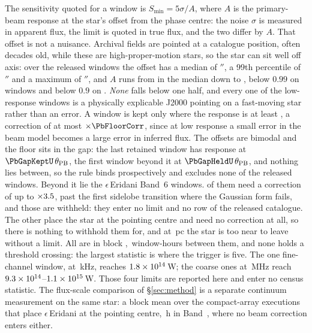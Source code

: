 The sensitivity quoted for a window is $S_{\min}=5\sigma/A$, where $A$ is the
primary-beam response at the star's offset from the phase centre: the noise
$\sigma$ is measured in apparent flux, the limit is quoted in true flux, and
the two differ by $A$. That offset is not a nuisance. Archival fields are
pointed at a catalogue position, often decades old, while these are
high-proper-motion stars, so the star can sit well off axis: over the
\PbNWin{} released windows the offset has a median of \PbOffMed$''$, a 99th
percentile of \PbOffPNN$''$ and a maximum of \PbOffMax$''$, and $A$ runs from
\PbAMed{} in the median down to \PbAMin, below $0.99$ on \PbNLowNN{} windows
and below $0.9$ on \PbNLowN. \emph{None} falls below one half, and every one
of the low-response windows is a physically explicable J2000 pointing on a
fast-moving star rather than an error. A window is kept only where the
response is at least \PbFloorResp, a correction of at most
$\times\PbFloorCorr$, since at low response a small error in the beam model
becomes a large error in inferred flux. The offsets are bimodal and the floor
sits in the gap: the last retained window has response \PbGapKeptResp{} at
$\PbGapKeptU\,\theta_{\rm PB}$, the first window beyond it \PbGapHeldResp{}
at $\PbGapHeldU\,\theta_{\rm PB}$, and nothing lies between, so the rule
binds prospectively and excludes none of the \NWindows{} released windows.
Beyond it lie the \EpsEriNWin{} $\epsilon$\,Eridani Band~6 windows.
\EpsEriNOffAxis{} of them need a correction of up to $\times3.5$,
past the first sidelobe transition where the Gaussian form fails, and those
are withheld: they enter no limit and no row of the released catalogue. The
other \EpsEriNOnAxis{} place the star at the pointing centre and need no
correction at all, so there is nothing to withhold them for, and at
\EpsEriDistPc\,pc the star is too near to leave without a limit. All
\EpsEriNOnAxis{} are in block \texttt{\BkEpsOnBlock},
\BkEpsOnHours\,window-hours between them, and none holds a threshold
crossing: the largest statistic is \BkEpsOnTMax{} where the trigger is five.
The one fine-channel window, at \BkEpsOnChanFineKHz\,kHz, reaches
$1.8\times10^{14}$\,W; the \BkEpsOnNCoarse{} coarse ones at
\BkEpsOnChanCoarseMHz\,MHz reach
$9.3\times10^{14}$--$1.1\times10^{15}$\,W. Those four limits are
reported here and enter no census statistic. The flux-scale comparison of
\S\ref{sec:method} is a separate continuum measurement on the same star: a
block mean over the \PxEpsN{} compact-array executions that place
$\epsilon$\,Eridani at the pointing centre, \PxEpsHours\,h in
Band~\PxEpsBand, where no beam correction enters either.

